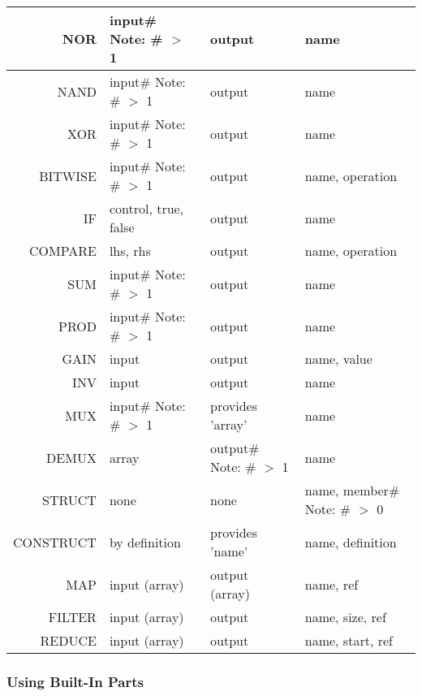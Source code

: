 \begin{longtable}[c]{ |r|l|l|l| }
    \hline
    NOR & \specialcell{input\# \\ Note: \# $>$ 1} & output & name \\
    \hline
    NAND & \specialcell{input\# \\ Note: \# $>$ 1} & output & name \\
    \hline
    XOR & \specialcell{input\# \\ Note: \# $>$ 1} & output & name \\
    \hline
    BITWISE & \specialcell{input\# \\ Note: \# $>$ 1} & output & name, operation \\
    \hline
    IF & control, true, false & output & name \\
    \hline
    COMPARE & lhs, rhs  & output & name, operation \\
    \hline
    SUM & \specialcell{input\# \\ Note: \# $>$ 1} & output & name \\
    \hline
    PROD & \specialcell{input\# \\ Note: \# $>$ 1} & output & name \\
    \hline
    GAIN & input & output & name, value \\
    \hline
    INV & input & output & name \\
    \hline
    \hline
    MUX & \specialcell{input\# \\ Note: \# $>$ 1} & provides 'array' & name \\
    \hline
    DEMUX & array & \specialcell{output\# \\ Note: \# $>$ 1} & name \\
    \hline
    STRUCT & none & none & name, \specialcell{member\# \\ Note: \# $>$ 0} \\
    \hline
    CONSTRUCT & by definition & provides 'name' & name, definition \\
    \hline
    \hline
    MAP & input (array) & output (array) & name, ref \\
    \hline
    FILTER & input (array) & output & name, size, ref \\
    \hline
    REDUCE & input (array) & output & name, start, ref \\
    \hline
\end{longtable}
\subsubsection{Using Built-In Parts}
